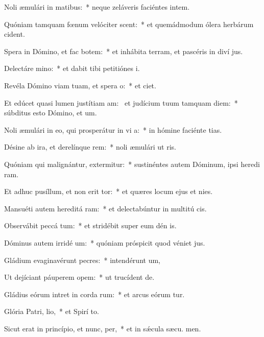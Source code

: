 \item Noli æmulári in matibus:~* neque zeláveris faciéntes intem.
\item Quóniam tamquam fœnum velóciter scent:~* et quemádmodum ólera herbárum  cident.
\item Spera in Dómino, et fac botem:~* et inhábita terram, et pascéris in diví jus.
\item Delectáre  mino:~* et dabit tibi petitiónes  i.
\item Revéla Dómino viam tuam, et spera  o:~* et  ciet.
\item Et edúcet quasi lumen justítiam am:~\pscross{} et judícium tuum tamquam diem:~* súbditus esto Dómino, et  um.
\item Noli æmulári in eo, qui prosperátur in vi a:~* in hómine faciénte tias.
\item Désine ab ira, et derelínque rem:~* noli æmulári ut ris.
\item Quóniam qui malignántur, extermitur:~* sustinéntes autem Dóminum, ipsi heredi ram.
\item Et adhuc pusíllum, et non erit tor:~* et quæres locum ejus et  nies.
\item Mansuéti autem hereditá ram:~* et delectabúntur in multitú cis.
\item Observábit peccá tum:~* et stridébit super eum dén is.
\item Dóminus autem irridé um:~* quóniam próspicit quod véniet  jus.
\item Gládium evaginavérunt pecres:~* intendérunt  um,
\item Ut dejíciant páuperem  opem:~* ut trucídent  de.
\item Gládius eórum intret in corda rum:~* et arcus eórum tur.
\item Glória Patri,  lio,~* et Spirí to.
\item Sicut erat in princípio, et nunc,  per,~* et in sǽcula sæcu. men.
